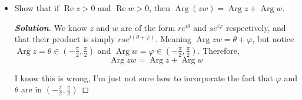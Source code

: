 \documentclass[11pt]{article}
\newenvironment{problem}[2][Problem\!]{\begin{trivlist}
\item[\hskip \labelsep {\bfseries #1}\hskip \labelsep {\bfseries #2}]}{\end{trivlist}}
\newenvironment{solution}{\begin{proof}[\textbf{\textit{Solution}}] }{\end{proof}}
\newcommand{\parg}{\operatorname{Arg}}
\renewcommand{\phi}{\varphi}
\renewcommand{\Re}{\operatorname{Re}}
\begin{document}
\begin{problem}{2.1}
\begin{itemize}[itemsep=3em]
\item[(b)] Show that if $\Re z > 0$ and $\Re w > 0$, then $\parg(zw) = \parg z + \parg w$.
\begin{example}
    \begin{solution}
        We know $z$ and $w$ are of the form $re^{i \theta}$ and $se^{i \phi}$ respectively, and that their product is simply $rse^{i(\theta + \phi)}$. Meaning $\parg zw = \theta + \phi$, but notice $\parg z = \theta \in (-\frac{\pi}{2},\frac{\pi}{2} )$ and $\parg w = \phi \in (-\frac{\pi}{2},\frac{\pi}{2} )$. Therefore,
        \[\parg zw = \parg z + \parg w\]

        I know this is wrong, I'm just not sure how to incorporate the fact that $\phi$ and $\theta$ are in $(-\frac{\pi}{2}, \frac{\pi}{2})$
    \end{solution}
\end{example}

\end{itemize}
\end{problem}

\newpage  %
\end{document}
